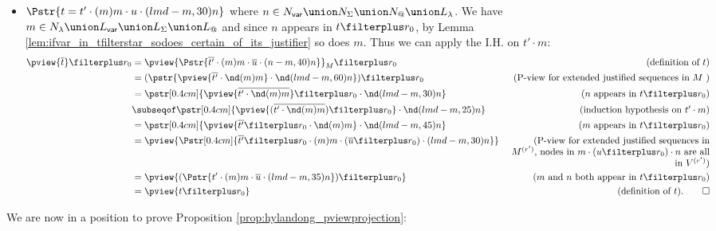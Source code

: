 \begin{itemize}
    \item $\Pstr{ t =  t' \cdot (m){m} \cdot u \cdot (lmd-m,30){n} }$
    where $n \in N_{\sf var} \union N_\Sigma \union N_@ \union L_\lambda$. We have
    $m\in N_\lambda \union L_{\sf var} \union L_\Sigma \union L_@$ and since $n$ appears in $t\filterplus r_0$, by Lemma \ref{lem:ifvar_in_tfilterstar_sodoes_certain_of_its_justifier} so does $m$. Thus we can apply the I.H. on $t' \cdot m$: \begin{align*}
        \pview{\overline{t}} \filterplus r_0
        &= \pview{\Pstr{\overline{t'} \cdot (m){m} \cdot \overline{u} \cdot (n-m,40){n}}}_M \filterplus r_0
                & (\mbox{definition of } t)\\
        &= (\pstr{\pview{\overline{t'} \cdot \nd(m){m}}  \cdot \nd(lmd-m,60){n}}) \filterplus r_0
                & (\mbox{P-view for extended justified sequences in $M$ }) \\
        &= \pstr[0.4cm]{ \pview{\overline{t' \cdot \nd(m){m}}} \filterplus r_0  \cdot  \nd(lmd-m,30){n} }
                & (\mbox{$n$ appears in $t \filterplus r_0$}) \\
        &\subseqof \pstr[0.4cm]{ \pview{(\overline{t' \cdot \nd(m){m}} )\filterplus r_0} \cdot \nd(lmd-m,25){n} }
                & \mbox{(induction hypothesis on $t' \cdot m$)} \\
        &= \pstr[0.4cm]{ \pview{\overline{t'}\filterplus r_0 \cdot \nd(m){m}} \cdot \nd(lmd-m,45){n} }
                & \mbox{($m$ appears in $t \filterplus r_0$)} \\
        &= \pview{ \Pstr[0.4cm]{\overline{t'} \filterplus r_0 \cdot (m){m} \cdot {(\overline{u} \filterplus r_0)} \cdot (lmd-m,30){n}}}
                & \parbox[t]{7.5cm}{\raggedleft(P-view for extended justified sequences in $M^{(r')}$, nodes in $m\cdot (u \filterplus r_0) \cdot n$ are all in $V^{(r')}$)} \\
        &= \pview{ (\Pstr{t' \cdot (m){m} \cdot \overline{u} \cdot (lmd-m,35){n}}) \filterplus r_0 }
                & \mbox{($m$ and $n$ both appear in } t \filterplus r_0) \\
        &= \pview{ t \filterplus r_0 }
                & \mbox{(definition of $t$).} \qed
      \end{align*}
\end{itemize}

We are now in a position to prove Proposition
\ref{prop:hylandong_pviewprojection}:


